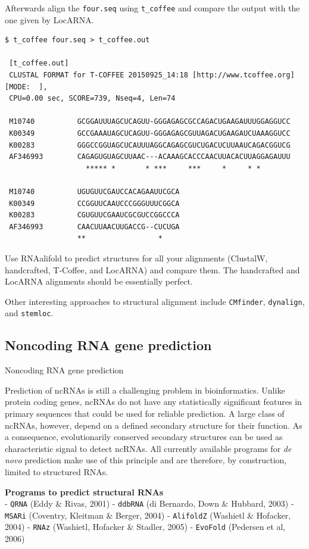 \documentclass[]{article}
\begin{document}
Afterwards align the \texttt{four.seq} using \texttt{t\_coffee} and
compare the output with the one given by LocARNA.

\begin{verbatim}
$ t_coffee four.seq > t_coffee.out

 [t_coffee.out]
 CLUSTAL FORMAT for T-COFFEE 20150925_14:18 [http://www.tcoffee.org] [MODE:  ],
 CPU=0.00 sec, SCORE=739, Nseq=4, Len=74

 M10740          GCGGAUUUAGCUCAGUU-GGGAGAGCGCCAGACUGAAGAUUUGGAGGUCC
 K00349          GCCGAAAUAGCUCAGUU-GGGAGAGCGUUAGACUGAAGAUCUAAAGGUCC
 K00283          GGGCCGGUAGCUCAUUUAGGCAGAGCGUCUGACUCUUAAUCAGACGGUCG
 AF346993        CAGAGUGUAGCUUAAC---ACAAAGCACCCAACUUACACUUAGGAGAUUU
                   ***** *       * ***     ***     *     * *

 M10740          UGUGUUCGAUCCACAGAAUUCGCA
 K00349          CCGGUUCAAUCCCGGGUUUCGGCA
 K00283          CGUGUUCGAAUCGCGUCCGGCCCA
 AF346993        CAACUUAACUUGACCG--CUCUGA
                 **                 *
\end{verbatim}

Use RNAalifold to predict structures for all your alignments (ClustalW,
handcrafted, T-Coffee, and LocARNA) and compare them. The handcrafted and
LocARNA alignments should be essentially perfect.

Other interesting approaches to structural alignment include
\texttt{CMfinder}, \texttt{dynalign}, and \texttt{stemloc}.

\subsection{Noncoding RNA gene prediction}{Noncoding RNA gene prediction}\label{noncoding-rna-gene-prediction}

Prediction of ncRNAs is still a challenging problem in bioinformatics.
Unlike protein coding genes, ncRNAs do not have any statistically
significant features in primary sequences that could be used for reliable
prediction. A large class of ncRNAs, however, depend on a defined
secondary structure for their function. As a consequence, evolutionarily
conserved secondary structures can be used as characteristic signal to
detect ncRNAs. All currently available programs for \emph{de novo}
prediction make use of this principle and are therefore, by
construction, limited to structured RNAs.

\textbf{Programs to predict structural RNAs}\\
- \texttt{QRNA} (Eddy \& Rivas, 2001) - \texttt{ddbRNA} (di Bernardo,
Down \& Hubbard, 2003) - \texttt{MSARi} (Coventry, Kleitman \& Berger,
2004) - \texttt{AlifoldZ} (Washietl \& Hofacker, 2004) - \texttt{RNAz}
(Washietl, Hofacker \& Stadler, 2005) - \texttt{EvoFold} (Pedersen et
al, 2006)
\end{document}
